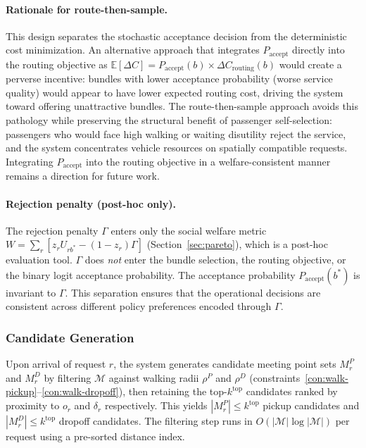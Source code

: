 \paragraph{Rationale for route-then-sample.}
This design separates the stochastic acceptance decision from the deterministic
cost minimization. An alternative approach that integrates $P_{\text{accept}}$
directly into the routing objective as $\mathbb{E}[\Delta C] = P_{\text{accept}}(b)
\times \Delta C_{\text{routing}}(b)$ would create a perverse incentive: bundles with
lower acceptance probability (worse service quality) would appear to have lower
expected routing cost, driving the system toward offering unattractive bundles.
The route-then-sample approach avoids this pathology while preserving the structural
benefit of passenger self-selection: passengers who would face high walking or
waiting disutility reject the service, and the system concentrates vehicle resources
on spatially compatible requests. Integrating $P_{\text{accept}}$ into the routing
objective in a welfare-consistent manner remains a direction for future work.

\paragraph{Rejection penalty (post-hoc only).}
The rejection penalty $\Gamma$ enters only the social welfare metric
$W = \sum_r [z_r U_{rb^*} - (1-z_r)\Gamma]$ (Section~\ref{sec:pareto}),
which is a post-hoc evaluation tool. $\Gamma$ does \emph{not} enter the bundle
selection, the routing objective, or the binary logit acceptance probability.
The acceptance probability $P_{\text{accept}}(b^*)$ is invariant to $\Gamma$.
This separation ensures that the operational decisions are consistent across
different policy preferences encoded through $\Gamma$.

\subsubsection{Candidate Generation}

Upon arrival of request $r$, the system generates candidate meeting point sets $M_r^P$
and $M_r^D$ by filtering $\mathcal{M}$ against walking radii $\rho^P$ and $\rho^D$
(constraints~\ref{con:walk-pickup}--\ref{con:walk-dropoff}), then retaining the
top-$k^{\text{top}}$ candidates ranked by proximity to $o_r$ and $\delta_r$ respectively.
This yields $|M_r^P| \leq k^{\text{top}}$ pickup candidates and
$|M_r^D| \leq k^{\text{top}}$ dropoff candidates. The filtering step runs in
$O(|\mathcal{M}| \log |\mathcal{M}|)$ per request using a pre-sorted distance index.

